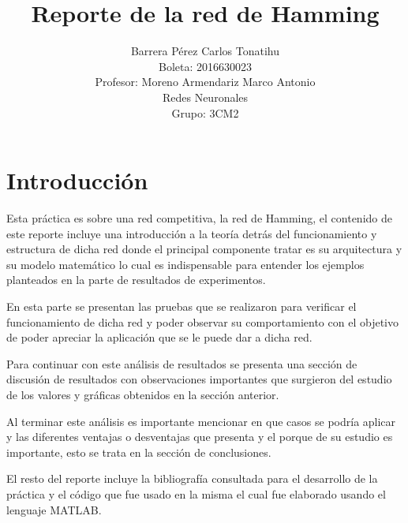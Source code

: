 \documentclass[12pt, titlepage]{article}
\title{Reporte de la red de Hamming}
\author{Barrera Pérez Carlos Tonatihu \\ Boleta: 2016630023 \\ Profesor: Moreno Armendariz Marco Antonio \\ Redes Neuronales \\ Grupo: 3CM2 }
\begin{document}
    \maketitle
    \tableofcontents
    \newpage
    \section{Introducción}
    Esta práctica es sobre una red competitiva, la red de Hamming, el contenido de este reporte incluye una introducción a la teoría detrás del funcionamiento y estructura de dicha red donde el principal componente  tratar es su arquitectura y su modelo matemático lo cual es indispensable para entender los ejemplos planteados en la parte de resultados de experimentos.
    
    En esta parte se presentan las pruebas que se realizaron para verificar el funcionamiento de dicha red y poder observar su comportamiento con el objetivo de poder apreciar la aplicación que se le puede dar a dicha red.
    
    Para continuar con este análisis de resultados se presenta una sección de discusión de resultados con observaciones importantes que surgieron del estudio de los valores y gráficas obtenidos en la sección anterior.
    
    Al terminar este análisis es importante mencionar en que casos se podría aplicar y las diferentes ventajas o desventajas que presenta y el porque de su estudio es importante, esto se trata en la sección de conclusiones.
    
    El resto del reporte incluye la bibliografía consultada para el desarrollo de la práctica y el código que fue usado en la misma el cual fue elaborado usando el lenguaje MATLAB.
    \newpage
\end{document}
